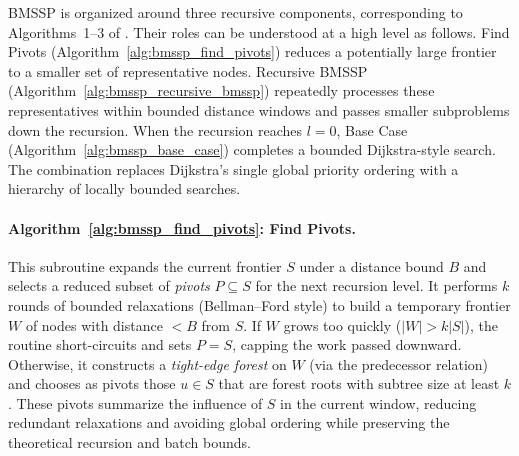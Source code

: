 \documentclass[ijoc,blindrev]{informs3} %
\begin{document}
{\color{blue}
BMSSP is organized around three recursive components, corresponding to Algorithms~1--3 of \citet{duan_breaking_2025}. Their roles can be understood at a high level as follows. Find Pivots (Algorithm~\ref{alg:bmssp_find_pivots}) reduces a potentially large frontier to a smaller set of representative nodes. Recursive BMSSP (Algorithm~\ref{alg:bmssp_recursive_bmssp}) repeatedly processes these representatives within bounded distance windows and passes smaller subproblems down the recursion. When the recursion reaches \(l=0\), Base Case (Algorithm~\ref{alg:bmssp_base_case}) completes a bounded Dijkstra-style search. The combination replaces Dijkstra's single global priority ordering with a hierarchy of locally bounded searches.
}


\paragraph{Algorithm~\ref{alg:bmssp_find_pivots}: Find Pivots.}
This subroutine expands the current frontier $S$ under a distance bound $B$ and selects a reduced subset of \emph{pivots} $P \subseteq S$ for the next recursion level. It performs $k$ rounds of bounded relaxations (Bellman--Ford style) to build a temporary frontier $W$ of nodes with distance $< B$ from $S$. If $W$ grows too quickly ($|W| > k|S|$), the routine short-circuits and sets $P = S$, capping the work passed downward. Otherwise, it constructs a \emph{tight-edge forest} on $W$ (via the predecessor relation) and chooses as pivots those $u \in S$ that are forest roots with subtree size at least $k$. These pivots summarize the influence of $S$ in the current window, reducing redundant relaxations and avoiding global ordering while preserving the theoretical recursion and batch bounds.
\end{document}
